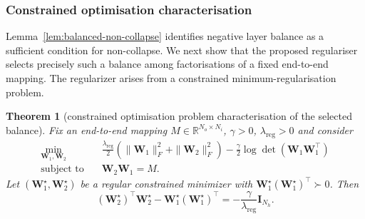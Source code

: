 \documentclass{article} %
\newcommand{\wa}{\mathbf{W}_1}
\newcommand{\wb}{\mathbf{W}_2}
\newtheorem{theorem}{Theorem}[section]
\theoremstyle{remark}
\newtheorem{remark}[theorem]{Remark}
\begin{document}





\subsubsection{Constrained optimisation characterisation}
\label{app:opptimisation}
Lemma~\ref{lem:balanced-non-collapse} identifies negative layer balance
as a sufficient condition for non-collapse. We next show that the
proposed regulariser selects precisely such a balance among factorisations of a fixed end-to-end mapping. The regularizer arises from a constrained minimum-regularisation problem.

\begin{theorem}[constrained
optimisation problem characterisation of the selected balance]
\label{app:thm:encoder-variational-balance}
Fix an end-to-end mapping $
M\in\mathbb{R}^{N_o\times N_i}$, $\gamma > 0$, $\lambda_{\mathrm{reg}}> 0$
and consider
\begin{equation}
\begin{aligned}
\min_{\wa,\wb}\quad&
\frac{\lambda_{\mathrm{reg}}}{2}
\left(
    \|\wa\|_F^2+\|\wb\|_F^2
\right)
-
\frac{\gamma}{2}
\log\det\left(\wa\wa^\top\right)
\\
\text{subject to}\quad&
\wb\wa=M.
\end{aligned}
\label{eq:encoder-constrained-problem}
\end{equation}
Let \((\wa^\star,\wb^\star)\) be a regular constrained minimizer with
\(\wa^\star(\wa^\star)^\top\succ0\). Then
\begin{equation}
\boxed{
(\wb^\star)^\top\wb^\star
-
\wa^\star(\wa^\star)^\top
=
-\frac{\gamma}{\lambda_{\mathrm{reg}}}
\mathbf{I}_{N_h}
}.
\label{eq:encoder-variational-balance}
\end{equation}
\end{theorem}
\end{document}
